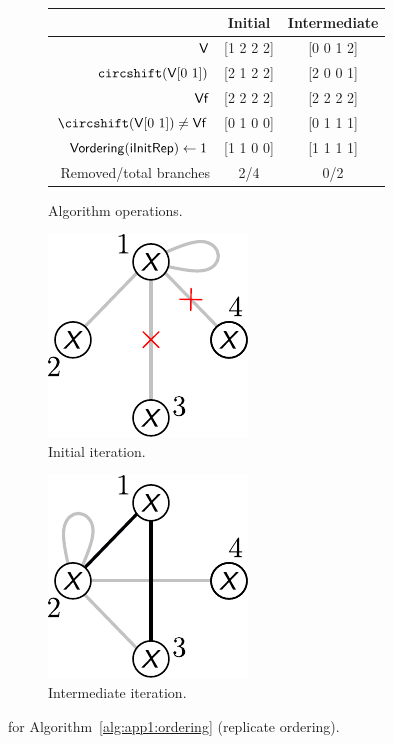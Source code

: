 \begin{figure}[!ht]

\begin{subfigure}[b]{\textwidth}
\centering
\begin{tabular}{r | c | c}
\hline \hline
 & Initial & Intermediate \\ 
\hline
$\textup{\textsf{V}}$ & [1 2 2 2] & [0 0 1 2] \\
$\texttt{circshift}(\textup{\textsf{V}} [0\ 1])$  & [2 1 2 2] & [2 0 0 1] \\
$\textup{\textsf{Vf}}$  & [2 2 2 2] & [2 2 2 2] \\
$\circshift(\xvar{V}[0\ 1]) \neq \xvar{Vf}$  & [0 1 0 0] & [0 1 1 1] \\
$\textup{\textsf{Vordering}}(\textup{\textsf{iInitRep}}) \leftarrow 1$ & [1 1 0 0] & [1 1 1 1] \\
Removed/total branches & 2/4 & 0/2 \\
\hline \hline
\end{tabular}
\caption{Algorithm operations.\label{tb:app1:ordering-ex1-V}}
\end{subfigure}%

\begin{subfigure}[b]{0.5\textwidth}
\centering
\includegraphics[scale=1]{../app1/fig/ordering-ex1-original_v2}
\caption{Initial iteration.\label{fig:app1:ordering-ex1-original}}
\end{subfigure}%
\begin{subfigure}[b]{0.5\textwidth}
\centering
 \includegraphics[scale=1]{../app1/fig/ordering-ex1-intermediate_v2}
 \caption{Intermediate iteration.\label{fig:app1:ordering-ex1-intermediate}}
\end{subfigure}%

\caption{ for Algorithm~\ref{alg:app1:ordering} (replicate ordering).}
\end{figure}

